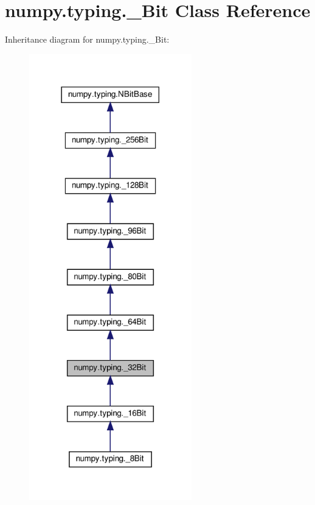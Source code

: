 \hypertarget{classnumpy_1_1typing_1_1__32Bit}{}\section{numpy.\+typing.\+\_\+Bit Class Reference}
\label{classnumpy_1_1typing_1_1__32Bit}


Inheritance diagram for numpy.\+typing.\+\_\+Bit\+:
\nopagebreak
\begin{figure}[H]
\begin{center}
\leavevmode
\includegraphics[width=200pt]{classnumpy_1_1typing_1_1__32Bit__inherit__graph}
\end{center}
\end{figure}


